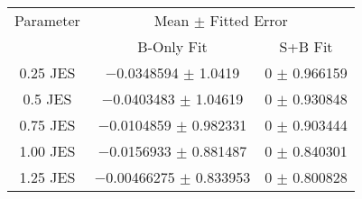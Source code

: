 \begin{scriptsize}
\begin{table}
\centering
\begin{tabular}{ccc}
\toprule
Parameter & \multicolumn{2}{c}{{Mean $\pm$ Fitted Error}}\\
 & {B-Only Fit} & {S+B Fit}\\
\midrule
\num[round-precision=2]{0.25} JES & \num{-0.0348594} $\pm$ \num{1.0419} & \num{0} $\pm$ \num{0.966159}\\
\num[round-precision=2]{0.5} JES & \num{-0.0403483} $\pm$ \num{1.04619} & \num{0} $\pm$ \num{0.930848}\\
\num[round-precision=2]{0.75} JES & \num{-0.0104859} $\pm$ \num{0.982331} & \num{0} $\pm$ \num{0.903444}\\
\num[round-precision=2]{1.00} JES & \num{-0.0156933} $\pm$ \num{0.881487} & \num{0} $\pm$ \num{0.840301}\\
\num[round-precision=2]{1.25} JES & \num{-0.00466275} $\pm$ \num{0.833953} & \num{0} $\pm$ \num{0.800828}\\
\bottomrule
\end{tabular}
\end{table}
\end{scriptsize}

